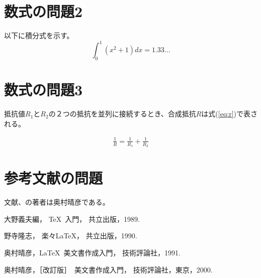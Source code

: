\documentclass[10pt,a4j,twocolumn]{jarticle}
\begin{document}
\section{数式の問題2}

以下に積分式を示す。
\[
 \int_{0}^{1}(x^2 + 1)dx = 1.33...
\]

\section{数式の問題3}

抵抗値$R_{1}$と$R_{2}$の２つの抵抗を並列に接続するとき、合成抵抗$R$は式(\ref{eq:r})で表される。

\begin{eqnarray}
 \frac{1}{R} = \frac{1}{R_1} + \frac{1}{R_2}
 \label{eq:r}
\end{eqnarray}

\section{参考文献の問題}

文献\cite{bibunsho}、\cite{Okumura}の著者は奥村晴彦である。

{\footnotesize
\begin{thebibliography}{9}

大野義夫編，
\TeX\ 入門，
共立出版，1989.

野寺隆志，
楽々\LaTeX{}，
共立出版，1990. 

奥村晴彦，\LaTeX\ 美文書作成入門，
技術評論社，1991. 

奥村晴彦，［改訂版］\LaTeXe\ 美文書作成入門，
技術評論社，東京，2000.

\end{thebibliography}
}
\end{document}
